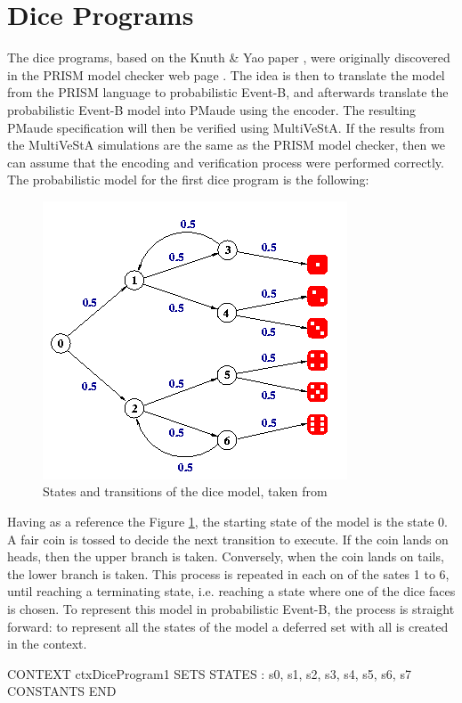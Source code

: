 \section{Dice Programs}
The dice programs, based on the Knuth \& Yao paper \cite{knuth}, were originally discovered in the PRISM model checker web page \cite{PRISMDICE}. The idea is then to translate the model from the PRISM language to probabilistic Event-B, and afterwards translate the probabilistic Event-B model into PMaude using the encoder. The resulting PMaude specification will then be verified using MultiVeStA. If the results from the MultiVeStA simulations are the same as the PRISM model checker, then we can assume that the encoding and verification process were performed correctly. The probabilistic model for the first dice program is the following:
\begin{figure}[H]
    \centering
    \includegraphics[scale = 0.5]{images/CS1.png}
    \caption{States and transitions of the dice model, taken from \cite{PRISMDICE}}
    \label{fig:ce1}
\end{figure}
Having as a reference the Figure \ref{fig:ce1}, the starting state of the model is the state 0. A fair coin is tossed to decide the next transition to execute. If the coin lands on heads, then the upper branch is taken. Conversely, when the coin lands on tails, the lower branch is taken. This process is repeated in each on of the sates 1 to 6, until reaching a terminating state, i.e. reaching a state where one of the dice faces is chosen. To represent this model in probabilistic Event-B, the process is straight forward: to represent all the states of the model a deferred set with all is created in the context.
\begin{maude}

CONTEXT ctxDiceProgram1
SETS 
    STATES : { s0, s1, s2, s3, s4, s5, s6, s7 }
CONSTANTS 
END
\end{maude}
